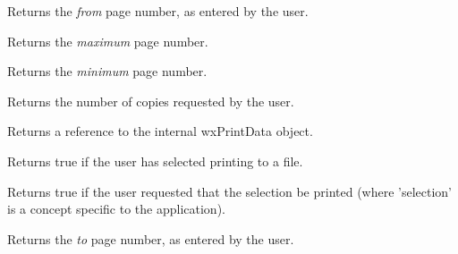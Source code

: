 \label{wxprintdialogdatagetfrompage}


Returns the {\it from} page number, as entered by the user.


\label{wxprintdialogdatagetmaxpage}


Returns the {\it maximum} page number.


\label{wxprintdialogdatagetminpage}


Returns the {\it minimum} page number.


\label{wxprintdialogdatagetnocopies}


Returns the number of copies requested by the user.


\label{wxprintdialogdatagetprintdata}


Returns a reference to the internal wxPrintData object.


\label{wxprintdialogdatagetprinttofile}


Returns true if the user has selected printing to a file.


\label{wxprintdialogdatagetselection}


Returns true if the user requested that the selection be printed (where 'selection' is
a concept specific to the application).


\label{wxprintdialogdatagettopage}


Returns the {\it to} page number, as entered by the user.


\label{wxprintdialogdataok}


